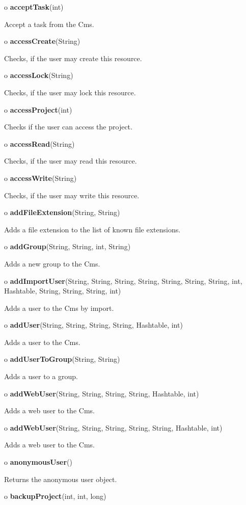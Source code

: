 \begin{description}
\item o {\bf acceptTask}(int)  

Accept a task from the Cms.  
\item o {\bf accessCreate}(String)  

Checks, if the user may create this resource.  
\item o {\bf accessLock}(String)  

Checks, if the user may lock this resource.  
\item o {\bf accessProject}(int)  

Checks if the user can access the project.  
\item o {\bf accessRead}(String)  

Checks, if the user may read this resource.  
\item o {\bf accessWrite}(String)  

Checks, if the user may write this resource.  
\item o {\bf addFileExtension}(String, String)  

Adds a file extension to the list of known file extensions.  
\item o {\bf addGroup}(String, String, int, String)  

Adds a new group to the Cms.  
\item o {\bf addImportUser}(String, String, String, String, String, String,
String, int, Hashtable, String, String, String, int)  

Adds a user to the Cms by import.  
\item o {\bf addUser}(String, String, String, String, Hashtable, int)  

Adds a user to the Cms.  
\item o {\bf addUserToGroup}(String, String)  

Adds a user to a group.  
\item o {\bf addWebUser}(String, String, String, String, Hashtable, int)  

Adds a web user to the Cms.  
\item o {\bf addWebUser}(String, String, String, String, String, Hashtable,
int)  

Adds a web user to the Cms.  
\item o {\bf anonymousUser}()  

Returns the anonymous user object.  
\item o {\bf backupProject}(int, int, long)  


\end{description}
